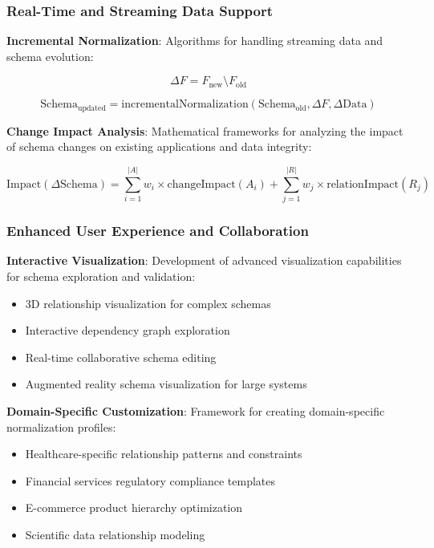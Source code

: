 \documentclass[acmsmall]{acmart}
\begin{document}
\subsubsection{Real-Time and Streaming Data Support}

\textbf{Incremental Normalization}: Algorithms for handling streaming data and schema evolution:

\begin{equation}
\Delta F = F_{\text{new}} \setminus F_{\text{old}}
\end{equation}

\begin{equation}
\text{Schema}_{\text{updated}} = \text{incrementalNormalization}(\text{Schema}_{\text{old}}, \Delta F, \Delta \text{Data})
\end{equation}

\textbf{Change Impact Analysis}: Mathematical frameworks for analyzing the impact of schema changes on existing applications and data integrity:

\begin{equation}
\text{Impact}(\Delta \text{Schema}) = \sum_{i=1}^{|A|} w_i \times \text{changeImpact}(A_i) + \sum_{j=1}^{|R|} w_j \times \text{relationImpact}(R_j)
\end{equation}

\subsubsection{Enhanced User Experience and Collaboration}

\textbf{Interactive Visualization}: Development of advanced visualization capabilities for schema exploration and validation:
\begin{itemize}
\item 3D relationship visualization for complex schemas
\item Interactive dependency graph exploration
\item Real-time collaborative schema editing
\item Augmented reality schema visualization for large systems
\end{itemize}

\textbf{Domain-Specific Customization}: Framework for creating domain-specific normalization profiles:
\begin{itemize}
\item Healthcare-specific relationship patterns and constraints
\item Financial services regulatory compliance templates
\item E-commerce product hierarchy optimization
\item Scientific data relationship modeling
\end{itemize}
\end{document}
